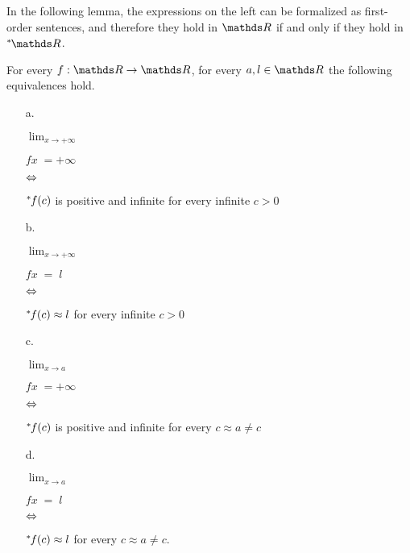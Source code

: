 In the following lemma, the expressions on the left can be formalized as first-order sentences, and therefore they hold in $\RR$ if and only if they hold in $\nsR$.

\begin{proposition}\label{prop_fattolimitinonstandard}
For every $f:\RR\to\RR$, for every $a, l\in\RR$ the following equivalences hold.\nobreak
\begin{itemize}
\item[a.]\parbox{7ex}{\hfil$\displaystyle\lim_{x\to+\infty}$}
\parbox{10ex}{$fx\;=+\infty$}
\parbox{5ex}{\hfil$\Leftrightarrow$}
${}^*\kern-.2ex f(c)$ is positive and infinite for every infinite $c>0$

\item[b.]\parbox{7ex}{\hfil$\displaystyle\lim_{x\to+\infty}$}
\parbox{10ex}{$fx\;=\;l$}
\parbox{6ex}{\hfil$\Leftrightarrow$}
${}^*\kern-.2ex f(c)\approx l$ for every infinite $c>0$

\item[c.]\parbox{7ex}{\hfil$\displaystyle\lim_{x\to a}$}
\parbox{10ex}{$fx\;=+\infty$}
\parbox{5ex}{\hfil$\Leftrightarrow$}
${}^*\kern-.2ex f(c)$ is positive and infinite for every $c\approx a\neq c$

\item[d.]\parbox{7ex}{\hfil$\displaystyle\lim_{x\to a}$}
\parbox{10ex}{$fx\;=\;l$}
\parbox{5ex}{\hfil$\Leftrightarrow$}
${}^*\kern-.2ex f(c)\approx l$ for every $c\approx a\neq c$.
\end{itemize}
\end{proposition}

